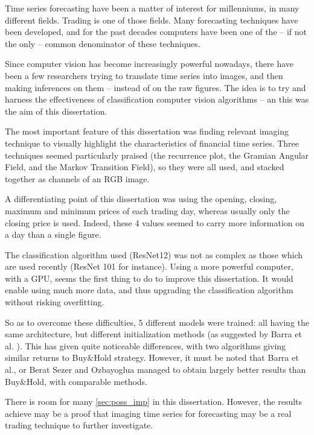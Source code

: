 \documentclass[11pt]{article}
\begin{document}
\begin{onehalfspace}
Time series forecasting have been a matter of interest for millenniums, in many different fields. Trading is one of those fields. Many forecasting techniques have been developed, and for the past decades computers have been one of the -- if not the only -- common denominator of these techniques. 

Since computer vision has become increasingly powerful nowadays, there have been a few researchers trying to translate time series into images, and then making inferences on them -- instead of on the raw figures. The idea is to try and harness the effectiveness of classification computer vision algorithms -- an this was the aim of this dissertation.

The most important feature of this dissertation was finding relevant imaging technique to visually highlight the characteristics of financial time series. Three techniques seemed particularly praised (the recurrence plot, the Gramian Angular Field, and the Markov Transition Field), so they were all used, and stacked together as channels of an RGB image. 

A differentiating point of this dissertation was using the opening, closing, maximum and minimum prices of each trading day, whereas usually only the closing price is used. Indeed, these 4 values seemed to carry more information on a day than a single figure. 

The classification algorithm used (ResNet12) was not as complex as those which are used recently (ResNet 101 for instance). Using a more powerful computer, with a GPU, seems the first thing to do to improve this dissertation. It would enable using much more data, and thus upgrading the classification algorithm without risking overfitting. 

So as to overcome these difficulties, 5 different models were trained: all having the same architecture, but different initialization methods (as suggested by Barra et al. \cite{barra}). This has given quite noticeable differences, with two algorithms giving similar returns to Buy\&Hold strategy. However, it must be noted that Barra et al., or Berat Sezer and Ozbayoglua \cite{berat} managed to obtain largely better results than Buy\&Hold, with comparable methods.

There is room for many \ref{sec:poss_imp} in this dissertation. However, the results achieve may be a proof that imaging time series for forecasting may be a real trading technique to further investigate. 




\end{onehalfspace}
\end{document}
